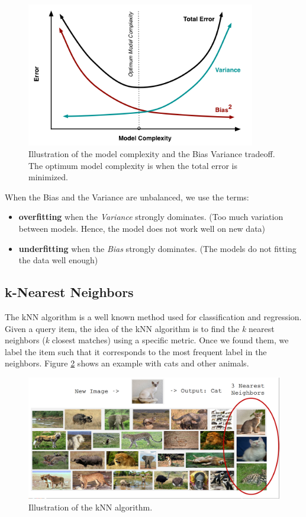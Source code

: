 \begin{figure}[H] %
\centerline{
\includegraphics[width=10cm]{img/07/biasvariance}
}
\caption{\label{BV} 
Illustration of the model complexity and the Bias Variance tradeoff. The optimum model complexity is when the total error is minimized.
}
\end{figure}
When the Bias and the Variance are unbalanced, we use the terms:
\begin{itemize}
 \item {\bf overfitting} when the \emph{Variance} strongly dominates. (Too much variation between models. Hence, the model does not work well on new data)
 \item {\bf underfitting} when the \emph{Bias} strongly dominates. (The models do not fitting the data well enough)
\end{itemize}


\subsection{k-Nearest Neighbors}

The kNN algorithm is a well known method used for classification and regression. Given a  query item, the idea of the kNN algorithm is to find the \emph{k} nearest neighbors (\emph{k} closest matches) using a specific metric. Once we found them, we label the item such that it corresponds to the most frequent label in the neighbors. Figure \ref{fig:knn} shows an example with cats and other animals.

\begin{figure}[H] %
\centerline{
\includegraphics[width=13cm]{img/07/knn}
}
\caption{\label{fig:knn} 
Illustration of the kNN algorithm.
}
\end{figure}

